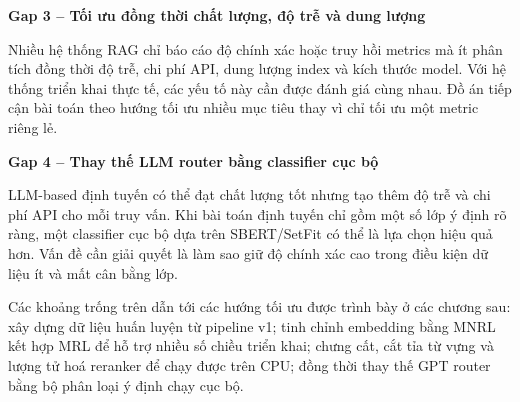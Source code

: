 \documentclass[../DoAn.tex]{subfiles}
\begin{document}
\noindent\textbf{Gap 3 -- Tối ưu đồng thời chất lượng, độ trễ và dung lượng}

Nhiều hệ thống RAG chỉ báo cáo độ chính xác hoặc truy hồi metrics mà ít phân tích đồng thời độ trễ, chi phí API, dung lượng index và kích thước model. Với hệ thống triển khai thực tế, các yếu tố này cần được đánh giá cùng nhau. Đồ án tiếp cận bài toán theo hướng tối ưu nhiều mục tiêu thay vì chỉ tối ưu một metric riêng lẻ.

\noindent\textbf{Gap 4 -- Thay thế LLM router bằng classifier cục bộ}

LLM-based định tuyến có thể đạt chất lượng tốt nhưng tạo thêm độ trễ và chi phí API cho mỗi truy vấn. Khi bài toán định tuyến chỉ gồm một số lớp ý định rõ ràng, một classifier cục bộ dựa trên SBERT/SetFit có thể là lựa chọn hiệu quả hơn. Vấn đề cần giải quyết là làm sao giữ độ chính xác cao trong điều kiện dữ liệu ít và mất cân bằng lớp.

Các khoảng trống trên dẫn tới các hướng tối ưu được trình bày ở các chương sau: xây dựng dữ liệu huấn luyện từ pipeline v1; tinh chỉnh embedding bằng MNRL kết hợp MRL để hỗ trợ nhiều số chiều triển khai; chưng cất, cắt tỉa từ vựng và lượng tử hoá reranker để chạy được trên CPU; đồng thời thay thế GPT router bằng bộ phân loại ý định chạy cục bộ.
\end{document}
